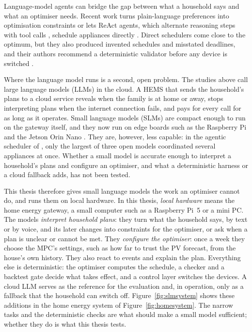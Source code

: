 Language-model agents can bridge the gap between what a household says
and what an optimiser needs. Recent work turns plain-language
preferences into optimisation constraints
\parencite{sanguinetti2025,michelon2025} or lets ReAct agents, which
alternate reasoning steps with tool calls \parencite{yao2023}, schedule
appliances directly \parencite{elmakroum2026,jonah2026}. Direct
schedulers come close to the optimum, but they also produced invented
schedules and misstated deadlines, and their authors recommend a
deterministic validator before any device is switched
\parencite{jonah2026}.

Where the language model runs is a second, open problem. The studies
above call large language models (LLMs) in the cloud. A HEMS that sends
the household's plans to a cloud service reveals when the family is at
home or away, stops interpreting plans when the internet connection
fails, and pays for every call for as long as it operates.
Small language models (SLMs) are compact enough to run on the gateway
itself, and they now run on edge boards such as the
Raspberry Pi and the Jetson Orin Nano \parencite{islam2025,spaias2027}.
They are, however, less capable: in the agentic scheduler of
\textcite{elmakroum2026}, only the largest of three open models
coordinated several appliances at once. Whether a small model is
accurate enough to interpret a household's plans and configure an
optimiser, and what a deterministic harness or a cloud fallback adds,
has not been tested.

This thesis therefore gives small language models the work an optimiser
cannot do, and runs them on local hardware. In this thesis,
\textit{local hardware} means the home energy gateway, a small computer
such as a Raspberry Pi~5 or a mini PC. The models \textit{interpret
household plans}: they turn what the household says, by text or by
voice, and its later changes into constraints for the optimiser, or ask
when a plan is unclear or cannot be met. They \textit{configure the
optimiser}: once a week they choose the MPC's settings, such as how far
to trust the PV forecast, from the house's own history. They also react
to events and explain the plan. Everything else is deterministic: the
optimiser computes the schedule, a checker and a backtest gate decide
what takes effect, and a control layer switches the devices. A cloud
LLM serves as the reference for the evaluation and, in operation, only
as a fallback that the household can switch off.
Figure~\ref{fig:slmsystem} shows these additions in the home energy
system of Figure~\ref{fig:homesystem}. The narrow tasks and
the deterministic checks are what should make a small model sufficient;
whether they do is what this thesis tests.

